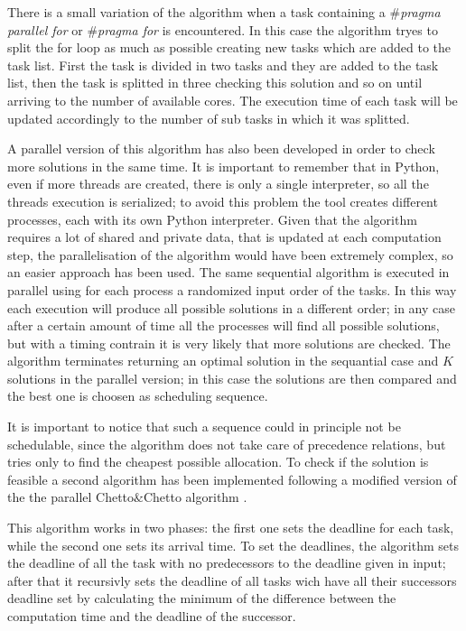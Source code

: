 \documentclass[a4paper,12pt,oneside]{book}
\begin{document}
There is a small variation of the algorithm when a task containing a \emph{$\#$pragma parallel for} or \emph{$\#$pragma for} is encountered. In this case the algorithm tryes to split the for loop as much as possible creating new tasks which are added to the task list. First the task is divided in two tasks and they are added to the task list, then the task is splitted in three checking this solution and so on until arriving to the number of available cores. The execution time of each task will be updated accordingly to the number of sub tasks in which it was splitted. 

A parallel version of this algorithm has also been developed in order to check more solutions in the same time. It is important to remember that in Python, even if more threads are created, there is only a single interpreter, so all the threads execution is serialized; to avoid this problem the tool creates different processes, each with its own Python interpreter. Given that the algorithm requires a lot of shared and private data, that is updated at each computation step, the parallelisation of the algorithm would have been extremely complex, so an easier approach has been used. The same sequential algorithm is executed in parallel using for each process a randomized input order of the tasks. In this way each execution will produce all possible solutions in a different order; in any case after a certain amount of time all the processes will find all possible solutions, but with a timing contrain it is very likely that  more solutions are checked. The algorithm terminates returning an optimal solution in the sequantial case and $K$ solutions in the parallel version; in this case the solutions are then compared and the best one is choosen as scheduling sequence.

It is important to notice that such a sequence could in principle not be schedulable, since the algorithm does not take care of precedence relations, but tries only to find the cheapest possible allocation. To check if the solution is feasible a second algorithm has been implemented following a modified version of the the parallel Chetto$\&$Chetto algorithm \cite{bbw2}.

This algorithm works in two phases: the first one sets the deadline for each task, while the second one sets its arrival time. To set the deadlines, the algorithm sets the deadline of all the task with no predecessors to the deadline given in input; after that it recursivly sets the deadline of all tasks wich have all their successors deadline set by calculating the minimum of the difference between the computation time and the deadline of the successor. 
\end{document}
